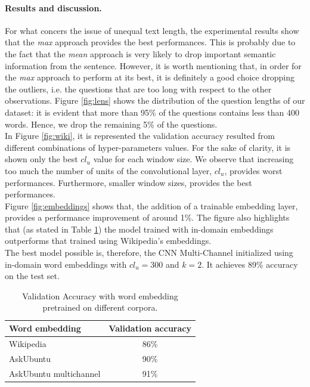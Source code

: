 \documentclass[10pt,twocolumn,letterpaper]{article}
\begin{document}
\paragraph{Results and discussion.}
For what concers the issue of unequal text length, the experimental results show that the \emph{max} approach provides the best performances. This is probably due to the fact that the \emph{mean} approach is very likely to drop important semantic information from the sentence. However, it is worth mentioning that, in order for the \emph{max} approach to perform at its best, it is  definitely a good choice dropping the outliers, i.e. the questions that are too long with respect to the other observations. Figure \ref{fig:lens} shows the distribution of the question lengths of our dataset: it is evident that more than 95\% of the questions contains less than 400 words. Hence, we drop the remaining 5\% of the questions.\\
In Figure \ref{fig:wiki}, it is represented the validation accuracy resulted from different combinations of hyper-parameters values. For the sake of clarity, it is shown only the best $cl_{u}$ value for each window size. We observe that increasing too much the number of units of the convolutional layer, $cl_{u}$, provides worst performances. Furthermore, smaller window sizes, provides the best performances.\\
Figure \ref{fig:embeddings} shows that, the addition of a trainable embedding layer, provides a performance improvement of around 1\%. The figure also highlights that (as stated in Table \ref{table:accuracy}) the model trained with in-domain embeddings outperforms that trained using Wikipedia's embeddings.\\
The best model possible is, therefore, the CNN Multi-Channel initialized using in-domain word embeddings with $cl_u=300$ and $k=2$. It achieves 89\% accuracy on the test set.
\begin{table}
\begin{center}
\begin{tabular}{|l|c|}
\hline
Word embedding & Validation accuracy \\
\hline
Wikipedia & 86\% \\
AskUbuntu & 90\% \\
AskUbuntu multichannel & 91\% \\
\hline
\end{tabular}
\end{center}
\caption{Validation Accuracy with word embedding pretrained on different corpora.}
\label{table:accuracy}
\end{table}
\end{document}
